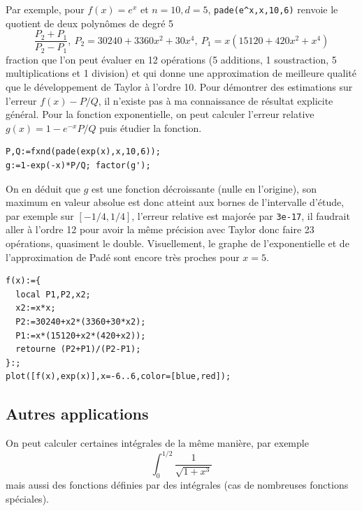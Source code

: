 \documentclass[a4paper,11pt]{article}
\begin{document}
Par exemple, pour $f(x)=e^x$ et $n=10, d=5$, \verb|pade(e^x,x,10,6)|
renvoie le quotient de deux polyn\^omes de degré 5
$$ \frac{P_2+P_1}{P_2-P_1}, \ P_2=30240+3360x^2+30x^4,\ P_1=x(15120+420x^2+x^4)$$
fraction que l'on peut évaluer en 12 op\'erations (5 additions, 1
soustraction, 5 multiplications et 1 division)
et qui donne une approximation de meilleure qualité que le
développement de Taylor à l'ordre 10.
Pour d\'emontrer des estimations sur l'erreur $f(x)-P/Q$, il n'existe
pas \`a ma connaissance de r\'esultat explicite g\'en\'eral. 
Pour la fonction exponentielle, on peut calculer l'erreur relative
$g(x)=1-e^{-x}P/Q$
puis \'etudier la fonction.
\begin{verbatim}
P,Q:=fxnd(pade(exp(x),x,10,6));
g:=1-exp(-x)*P/Q; factor(g');
\end{verbatim}
On en d\'eduit que $g$ est une fonction d\'ecroissante
(nulle en l'origine), son maximum en valeur absolue
est donc atteint aux bornes de l'intervalle d'\'etude, par
exemple sur $[-1/4,1/4]$, l'erreur relative est major\'ee
par \verb|3e-17|, il faudrait aller \`a l'ordre 12 pour
avoir la m\^eme pr\'ecision avec Taylor donc faire 23 op\'erations,
quasiment le double. Visuellement, le graphe de l'exponentielle et de
l'approximation de Pad\'e sont encore tr\`es proches pour $x=5$.
\begin{verbatim}
f(x):={
  local P1,P2,x2;
  x2:=x*x;
  P2:=30240+x2*(3360+30*x2);
  P1:=x*(15120+x2*(420+x2));
  retourne (P2+P1)/(P2-P1);
}:;
plot([f(x),exp(x)],x=-6..6,color=[blue,red]);
\end{verbatim}

\subsection{Autres applications}
On peut calculer certaines int\'egrales de la m\^eme mani\`ere,
par exemple
\[ \int _0^{1/2} \frac{1}{\sqrt{1+x^3}}\]
mais aussi des fonctions définies par des intégrales (cas de nombreuses
fonctions spéciales).
\end{document}
